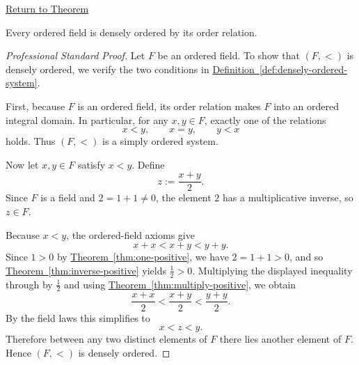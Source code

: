 \newpage
{}
\label{prf:ordered-fields-are-densely-ordered}

\begin{remark*}[Return]
\hyperref[thm:ordered-fields-are-densely-ordered]{Return to Theorem}
\end{remark*}

\begin{theorem*}
Every ordered field is densely ordered by its order relation.
\end{theorem*}

\begin{proof}[Professional Standard Proof]
\LRAProofBodyStart
Let $F$ be an ordered field. To show that $(F,<)$ is densely ordered, we verify
the two conditions in
\hyperref[def:densely-ordered-system]{Definition~\ref*{def:densely-ordered-system}}.

First, because $F$ is an ordered field, its order relation makes $F$ into an
ordered integral domain. In particular, for any $x,y\in F$, exactly one of the
relations
\[
x<y,\qquad x=y,\qquad y<x
\]
holds. Thus $(F,<)$ is a simply ordered system.

Now let $x,y\in F$ satisfy $x<y$. Define
\[
z:=\frac{x+y}{2}.
\]
Since $F$ is a field and $2=1+1\neq 0$, the element $2$ has a multiplicative
inverse, so $z\in F$.

Because $x<y$, the ordered-field axioms give
\[
x+x<x+y<y+y.
\]
Since $1>0$ by
\hyperref[thm:one-positive]{Theorem~\ref*{thm:one-positive}}, we have
$2=1+1>0$, and so
\hyperref[thm:inverse-positive]{Theorem~\ref*{thm:inverse-positive}} yields
$\frac12>0$. Multiplying the displayed inequality through by $\frac12$ and using
\hyperref[thm:multiply-positive]{Theorem~\ref*{thm:multiply-positive}}, we obtain
\[
\frac{x+x}{2}<\frac{x+y}{2}<\frac{y+y}{2}.
\]
By the field laws this simplifies to
\[
x<z<y.
\]
Therefore between any two distinct elements of $F$ there lies another element
of $F$. Hence $(F,<)$ is densely ordered.
\end{proof}

